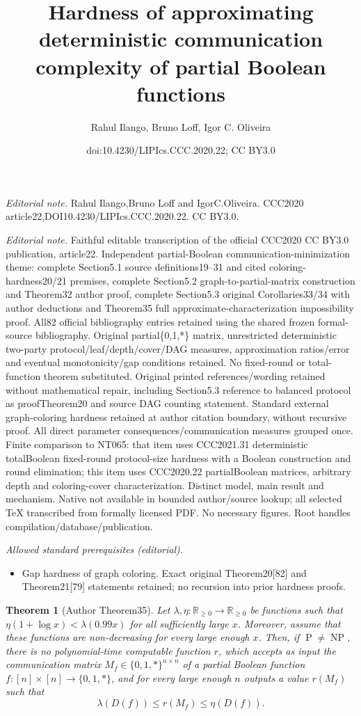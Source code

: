 \documentclass[10pt,a4paper]{article}
\title{Hardness of approximating deterministic communication complexity of partial Boolean functions}
\author{Rahul Ilango, Bruno Loff, Igor C. Oliveira}
\date{doi:10.4230/LIPIcs.CCC.2020.22; CC BY3.0}
\newtheorem{nttheorem}{Theorem}
\begin{document}
\maketitle
\noindent\textit{Editorial note.} Rahul Ilango,Bruno Loff and IgorC.Oliveira. CCC2020 article22,DOI10.4230/LIPIcs.CCC.2020.22. CC BY3.0.\par\medskip
\noindent\textit{Editorial note.} Faithful editable transcription of the official CCC2020 CC BY3.0 publication, article22. Independent partial-Boolean communication-minimization theme: complete Section5.1 source definitions19--31 and cited coloring-hardness20/21 premises, complete Section5.2 graph-to-partial-matrix construction and Theorem32 author proof, complete Section5.3 original Corollaries33/34 with author deductions and Theorem35 full approximate-characterization impossibility proof. All82 official bibliography entries retained using the shared frozen formal-source bibliography. Original partial\{0,1,*\} matrix, unrestricted deterministic two-party protocol/leaf/depth/cover/DAG measures, approximation ratios/error and eventual monotonicity/gap conditions retained. No fixed-round or total-function theorem substituted. Original printed references/wording retained without mathematical repair, including Section5.3 reference to balanced protocol as proofTheorem20 and source DAG counting statement. Standard external graph-coloring hardness retained at author citation boundary, without recursive proof. All direct parameter consequences/communication measures grouped once. Finite comparison to NT065: that item uses CCC2021.31 deterministic totalBoolean fixed-round protocol-size hardness with a Boolean construction and round elimination; this item uses CCC2020.22 partialBoolean matrices, arbitrary depth and coloring-cover characterization. Distinct model, main result and mechanism. Native not available in bounded author/source lookup; all selected TeX transcribed from formally licensed PDF. No necessary figures. Root handles compilation/database/publication.\par\medskip
\noindent\textit{Allowed standard prerequisites (editorial).}\begin{itemize}
\item Gap hardness of graph coloring. Exact original Theorem20[82] and Theorem21[79] statements retained; no recursion into prior hardness proofs.
\end{itemize}\medskip
\setcounter{nttheorem}{34}
\begin{nttheorem}[Author Theorem35]
Let $\lambda,\eta:\mathbb R_{\geq0}\to\mathbb R_{\geq0}$ be functions such that $\eta(1+\log x)<\lambda(0.99x)$ for all sufficiently large $x$. Moreover, assume that these functions are non-decreasing for every large enough $x$. Then, if $\operatorname P\ne\operatorname{NP}$, there is no polynomial-time computable function $r$, which accepts as input the communication matrix $M_f\in\{0,1,*\}^{n\times n}$ of a partial Boolean function $f:[n]\times[n]\to\{0,1,*\}$, and for every large enough $n$ outputs a value $r(M_f)$ such that
\[\lambda(D(f))\leq r(M_f)\leq\eta(D(f)).\]
\end{nttheorem}
\end{document}

